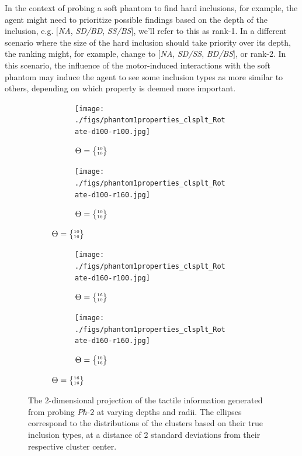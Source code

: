 \documentclass[]{interact}
\theoremstyle{plain}%
\theoremstyle{definition}
\theoremstyle{remark}
\begin{document}
In the context of probing a soft phantom to find hard inclusions, for example, the agent might need to 
prioritize possible findings based on the depth of the inclusion, e.g. $[$\textit{NA}, \textit{SD/BD}, 
\textit{SS/BS}$]$, we'll refer to this as rank-1. In a different scenario where the size of the hard 
inclusion should take priority over its depth, the ranking might, for example, change to 
$[$\textit{NA}, \textit{SD/SS}, \textit{BD/BS}$]$, or rank-2. In this scenario, the influence of 
the motor-induced interactions with the soft phantom may induce the agent to see some inclusion 
types as more similar to others, depending on which property is deemed more important.

\begin{figure}[]
	\centering
	\begin{subfigure}[b]{\textwidth}
		\begin{subfigure}[b]{.48\textwidth}
			\texttt{[image: ./figs/phantom1properties\_clsplt\_Rotate-d100-r100.jpg]}
			\caption{$\Theta = \tiny{\begin{Bmatrix}10\\ 10\end{Bmatrix}}$}
			\label{ResRot:100-100}
		\end{subfigure} 
		\hspace{0.01\textwidth}
		\begin{subfigure}[b]{0.48\textwidth}
			\texttt{[image: ./figs/phantom1properties\_clsplt\_Rotate-d100-r160.jpg]}
			\caption{$\Theta = \tiny{\begin{Bmatrix}10\\ 16\end{Bmatrix}}$}
			\label{ResRot:100-160}
		\end{subfigure}
		\vspace{4pt}
	\end{subfigure}
	\begin{subfigure}[b]{\textwidth}
		\begin{subfigure}[b]{0.48\textwidth}
			\texttt{[image: ./figs/phantom1properties\_clsplt\_Rotate-d160-r100.jpg]}
			\caption{$\Theta = \tiny{\begin{Bmatrix}16\\ 10\end{Bmatrix}}$}
			\label{ResRot:160-100}
		\end{subfigure}
		\hspace{0.01\textwidth}
		\begin{subfigure}[b]{0.48\textwidth}
			\texttt{[image: ./figs/phantom1properties\_clsplt\_Rotate-d160-r160.jpg]}
			\caption{$\Theta = \tiny{\begin{Bmatrix}16\\ 16\end{Bmatrix}}$}
			\label{ResRot:160-160}
		\end{subfigure}
	\end{subfigure}
	\caption{The 2-dimensional projection of the tactile information generated from probing $Ph\text{-}2$ 
		at varying depths and radii. The ellipses correspond to the distributions of the clusters based on 
		their true inclusion types, at a distance of 2 standard deviations from their respective cluster center.}
	\label{ResRot}
\end{figure}
\end{document}
